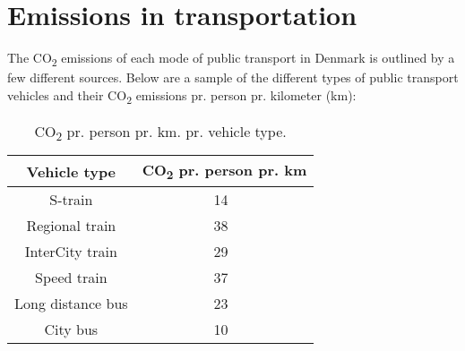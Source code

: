 \section{Emissions in transportation}\label{sec:emissions-in-transportation}

The \unit{CO_{2}} emissions of each mode of public transport in Denmark is outlined by a few different sources.
Below are a sample of the different types of public transport vehicles and their \unit{CO_{2}} emissions pr. person
pr. kilometer (km):

\begin{table}
    \centering
    \begin{tabular}{|c|c|}
        \hline
        Vehicle type & \unit{CO_{2}} pr. person pr. km \\
        \hline
        S-train & 14~\cite{dsb2023} \\
        Regional train & 38~\cite{dsb2023} \\
        InterCity train & 29~\cite{dsb2023} \\
        Speed train & 37~\cite{dsb2023} \\
        Long distance bus & 23~\cite{cowi2022} \\
        City bus & 10~\cite{ntm2023} \\
        \hline
    \end{tabular}
    \caption{\unit{CO_{2}} pr. person pr. km. pr. vehicle type.}
    \label{tab:emissions}
\end{table}
